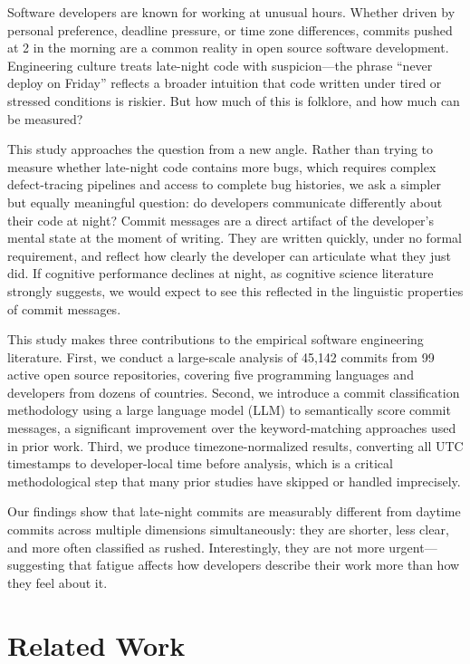\documentclass[sigconf]{acmart}
\begin{document}
Software developers are known for working at unusual hours. Whether driven by personal preference, deadline pressure, or time zone differences, commits pushed at 2 in the morning are a common reality in open source software development. Engineering culture treats late-night code with suspicion---the phrase ``never deploy on Friday'' reflects a broader intuition that code written under tired or stressed conditions is riskier. But how much of this is folklore, and how much can be measured?

This study approaches the question from a new angle. Rather than trying to measure whether late-night code contains more bugs, which requires complex defect-tracing pipelines and access to complete bug histories, we ask a simpler but equally meaningful question: do developers communicate differently about their code at night? Commit messages are a direct artifact of the developer's mental state at the moment of writing. They are written quickly, under no formal requirement, and reflect how clearly the developer can articulate what they just did. If cognitive performance declines at night, as cognitive science literature strongly suggests, we would expect to see this reflected in the linguistic properties of commit messages.

This study makes three contributions to the empirical software engineering literature. First, we conduct a large-scale analysis of 45,142 commits from 99 active open source repositories, covering five programming languages and developers from dozens of countries. Second, we introduce a commit classification methodology using a large language model (LLM) to semantically score commit messages, a significant improvement over the keyword-matching approaches used in prior work. Third, we produce timezone-normalized results, converting all UTC timestamps to developer-local time before analysis, which is a critical methodological step that many prior studies have skipped or handled imprecisely.

Our findings show that late-night commits are measurably different from daytime commits across multiple dimensions simultaneously: they are shorter, less clear, and more often classified as rushed. Interestingly, they are not more urgent---suggesting that fatigue affects how developers describe their work more than how they feel about it.

\section{Related Work}
\end{document}
